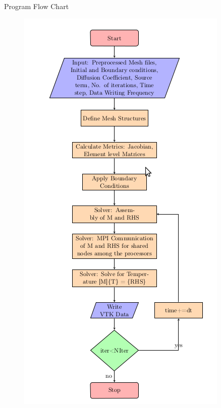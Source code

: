 \documentclass[t,english]{beamer}
\begin{document}
\begin{frame}[c]{Program Flow Chart}
\begin{multicols}{2}
\begin{figure}[ht!]
\includegraphics[trim=0 0 0 150,scale=0.4]{parallelflowchart1.png}
\end{figure}
\end{multicols}
\end{frame}
\end{document}
